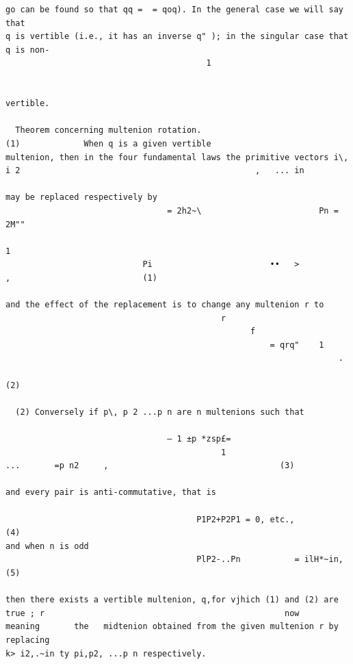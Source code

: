 \documentclass[10pt]{article}
\begin{document}
\begin{verbatim}
go can be found so that qq =  = qoq). In the general case we will say that
q is vertible (i.e., it has an inverse q" ); in the singular case that q is non-
                                         1


vertible.

  Theorem concerning multenion rotation.                                  (1)             When q is a given vertible
multenion, then in the four fundamental laws the primitive vectors i\, i 2                                                ,   ... in

may be replaced respectively by
                                 = 2h2~\                        Pn = 2M""
                                                                                                1
                            Pi                        ••   >                                        ,                           (1)

and the effect of the replacement is to change any multenion r to
                                            r
                                                  f
                                                      = qrq"    1
                                                                    .
                                                                                                                                (2)

  (2) Conversely if p\, p 2 ...p n are n multenions such that

                                 — 1 ±p *zsp£=
                                            1                           ...       =p n2     ,                                   (3)

and every pair is anti-commutative, that is

                                       P1P2+P2P1 = 0, etc.,                                                                     (4)
and when n is odd
                                       PlP2-..Pn           = ilH*~in,                                                           (5)

then there exists a vertible multenion, q,for vjhich (1) and (2) are true ; r                                                 now
meaning       the   midtenion obtained from the given multenion r by replacing
k> i2,.~in ty pi,p2, ...p n respectively.


\end{verbatim}
\clearpage
\end{document}
